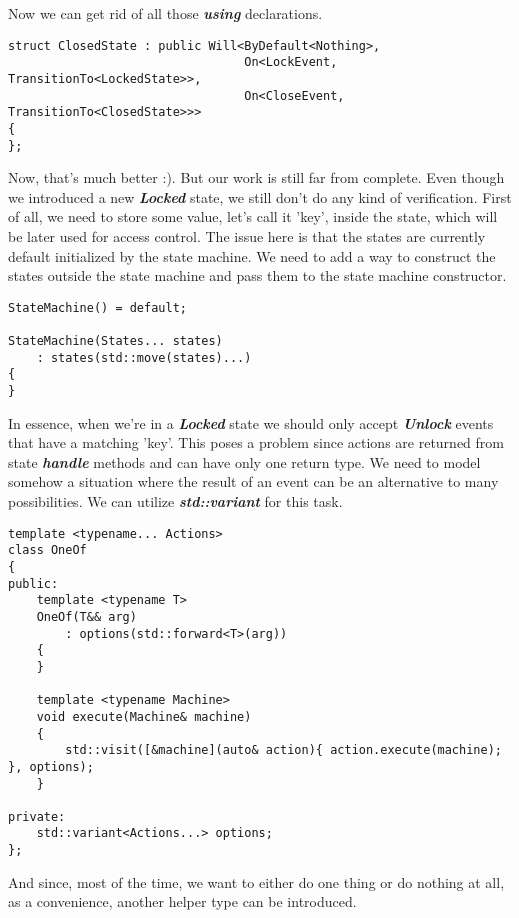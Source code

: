 \documentclass{article}[8pt]
\newcommand{\code}[1]{\textbf{\textit{#1}}}
\newcommand{\locked}{\code{Locked}}
\newcommand{\unlock}{\code{Unlock}}
\begin{document}
\bigskip
\inputminted[firstline=3]{c++}{../fsm/actions/Will.h}
\bigskip

Now we can get rid of all those \code{using} declarations.

\bigskip
\begin{verbatim}
struct ClosedState : public Will<ByDefault<Nothing>,
								 On<LockEvent, TransitionTo<LockedState>>,
								 On<CloseEvent, TransitionTo<ClosedState>>>
{
};
\end{verbatim}
\bigskip

Now, that's much better :). But our work is still far from complete. Even though we introduced a new \locked{} state, we still don't do any kind of verification. First of all, we need to store some value, let's call it 'key', inside the state, which will be later used for access control. The issue here is that the states are currently default initialized by the state machine. We need to add a way to construct the states outside the state machine and pass them to the state machine constructor.

\bigskip
\begin{verbatim}
StateMachine() = default;

StateMachine(States... states)
	: states(std::move(states)...)
{
}
\end{verbatim}
\bigskip

In essence, when we're in a \locked{} state we should only accept \unlock{} events that have a matching 'key'. This poses a problem since actions are returned from state \code{handle} methods and can have only one return type. We need to model somehow a situation where the result of an event can be an alternative to many possibilities. We can utilize \code{std::variant} for this task.

\bigskip
\begin{verbatim}
template <typename... Actions>
class OneOf
{
public:
	template <typename T>
	OneOf(T&& arg)
		: options(std::forward<T>(arg))
	{
	}

	template <typename Machine>
	void execute(Machine& machine)
	{
		std::visit([&machine](auto& action){ action.execute(machine); }, options);
	}

private:
	std::variant<Actions...> options;
};
\end{verbatim}
\bigskip

And since, most of the time, we want to either do one thing or do nothing at all, as a convenience, another helper type can be introduced.

\bigskip
\inputminted[firstline=5]{c++}{../fsm/actions/Maybe.h}
\bigskip
\end{document}
